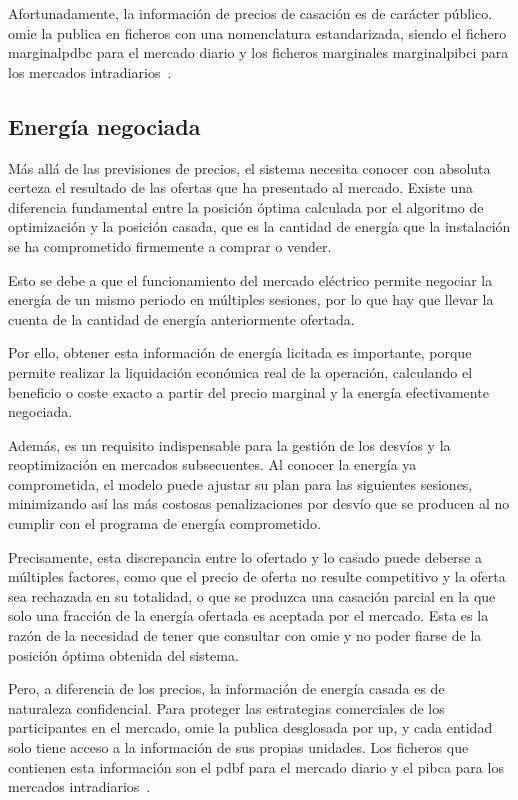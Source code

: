 Afortunadamente, la información de precios de casación es de carácter público. \Gls{omie} la publica en ficheros con una nomenclatura estandarizada, siendo el fichero \gls{marginalpdbc} para el mercado diario y los ficheros marginales \gls{marginalpibci} para los mercados intradiarios~\cite{cnmc2025resolucion}.

\subsection{Energía negociada}%
\label{makereference4.1.2}

Más allá de las previsiones de precios, el sistema necesita conocer con absoluta certeza el resultado de las ofertas que ha presentado al mercado. Existe una diferencia fundamental entre la posición óptima calculada por el algoritmo de optimización y la posición casada, que es la cantidad de energía que la instalación se ha comprometido firmemente a comprar o vender.

Esto se debe a que el funcionamiento del mercado eléctrico permite negociar la energía de un mismo periodo en múltiples sesiones, por lo que hay que llevar la cuenta de la cantidad de energía anteriormente ofertada.

Por ello, obtener esta información de energía licitada es importante, porque permite realizar la liquidación económica real de la operación, calculando el beneficio o coste exacto a partir del precio marginal y la energía efectivamente negociada.

Además, es un requisito indispensable para la gestión de los desvíos y la reoptimización en mercados subsecuentes. Al conocer la energía ya comprometida, el modelo puede ajustar su plan para las siguientes sesiones, minimizando así las más costosas penalizaciones por desvío que se producen al no cumplir con el programa de energía comprometido.

Precisamente, esta discrepancia entre lo ofertado y lo casado puede deberse a múltiples factores, como que el precio de oferta no resulte competitivo y la oferta sea rechazada en su totalidad, o que se produzca una casación parcial en la que solo una fracción de la energía ofertada es aceptada por el mercado. Esta es la razón de la necesidad de tener que consultar con \gls{omie} y no poder fiarse de la posición óptima obtenida del sistema.

Pero, a diferencia de los precios, la información de energía casada es de naturaleza confidencial. Para proteger las estrategias comerciales de los participantes en el mercado, \gls{omie} la publica desglosada por \gls{up}, y cada entidad solo tiene acceso a la información de sus propias unidades. Los ficheros que contienen esta información son el \gls{pdbf} para el mercado diario y el \gls{pibca} para los mercados intradiarios~\cite{cnmc2025resolucion}.

